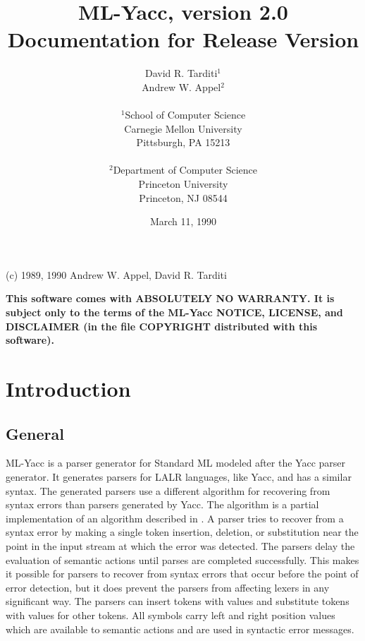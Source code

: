 \title{                        ML-Yacc, version 2.0  \\
                        Documentation for Release Version
      }
\author{                David R. Tarditi$^1$\\
                        Andrew W. Appel$^2$\\
\\              
$^1$School of Computer Science \\
Carnegie Mellon University \\
Pittsburgh, PA 15213 \\
\\
$^2$Department of Computer Science \\
    Princeton University \\
    Princeton, NJ 08544 
}
\date{March 11, 1990}


\maketitle
\begin{center}
(c) 1989, 1990 Andrew W. Appel, David R. Tarditi
\end{center}

{\bf
This software comes with ABSOLUTELY NO WARRANTY.  It is subject only to
the terms of the ML-Yacc NOTICE, LICENSE, and DISCLAIMER (in the
file COPYRIGHT distributed with this software).
}

\newpage
\tableofcontents
\newpage

\section{Introduction}
\subsection{General}
ML-Yacc is a parser generator for Standard ML modeled after the
Yacc parser generator.  It generates parsers for LALR languages, like Yacc,
and has a similar syntax.  The generated parsers use a different algorithm 
for recovering from syntax errors than parsers generated by Yacc.  
The algorithm is a partial implementation of an algorithm described in \cite{bf}.
A parser tries to recover from a syntax error
by making a single token insertion, deletion, or
substitution near the point in the input stream at which the error
was detected.  The parsers delay the evaluation of semantic actions until
parses are completed successfully.  This makes it possible for
parsers to recover from syntax errors that occur before the point
of error detection, but it does prevent the parsers from
affecting lexers in any significant way.  The parsers
can insert tokens with values and substitute tokens with values
for other tokens. All symbols carry left and right position values
which are available to semantic actions and are used in
syntactic error messages.

